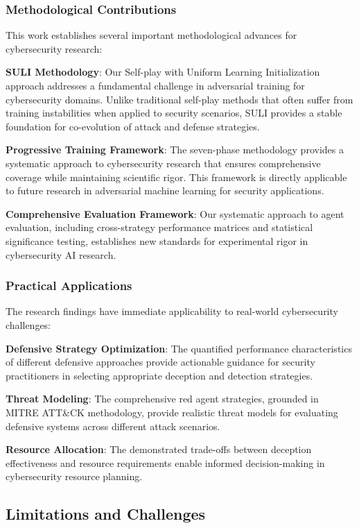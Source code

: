 \documentclass[12pt,twoside]{article}
\begin{document}
\subsubsection{Methodological Contributions}
This work establishes several important methodological advances for cybersecurity research:

\textbf{SULI Methodology}: Our Self-play with Uniform Learning Initialization approach addresses a fundamental challenge in adversarial training for cybersecurity domains. Unlike traditional self-play methods that often suffer from training instabilities when applied to security scenarios, SULI provides a stable foundation for co-evolution of attack and defense strategies.

\textbf{Progressive Training Framework}: The seven-phase methodology provides a systematic approach to cybersecurity research that ensures comprehensive coverage while maintaining scientific rigor. This framework is directly applicable to future research in adversarial machine learning for security applications.

\textbf{Comprehensive Evaluation Framework}: Our systematic approach to agent evaluation, including cross-strategy performance matrices and statistical significance testing, establishes new standards for experimental rigor in cybersecurity AI research.

\subsubsection{Practical Applications}
The research findings have immediate applicability to real-world cybersecurity challenges:

\textbf{Defensive Strategy Optimization}: The quantified performance characteristics of different defensive approaches provide actionable guidance for security practitioners in selecting appropriate deception and detection strategies.

\textbf{Threat Modeling}: The comprehensive red agent strategies, grounded in MITRE ATT\&CK methodology, provide realistic threat models for evaluating defensive systems across different attack scenarios.

\textbf{Resource Allocation}: The demonstrated trade-offs between deception effectiveness and resource requirements enable informed decision-making in cybersecurity resource planning.

\subsection{Limitations and Challenges}
\end{document}
